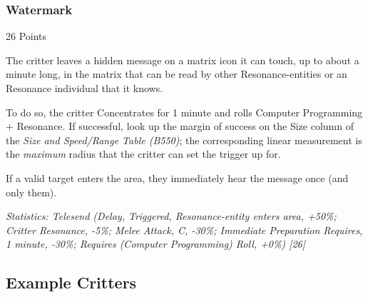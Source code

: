 \begin{multicols*}{3}
	\subsubsection{Watermark}\label{watermark}
	\begin{flushright}
		26 Points
	\end{flushright}

	The critter leaves a hidden message on a matrix icon it can touch, up to about a minute long, in the matrix that can be read by other Resonance-entities or an Resonance individual that it knows. 
	
	To do so, the critter Concentrates for 1 minute and rolls Computer Programming + Resonance. If successful, look up the margin of success on the Size column of the \textit{Size and Speed/Range Table (B550)}; the corresponding linear measurement is the \textit{maximum} radius that the critter can set the trigger up for.
	
	If a valid target enters the area, they immediately hear the message once (and only them).
	
	\textcolor{OliveGreen}{\textit{Statistics: Telesend (Delay, Triggered, Resonance-entity enters area, +50\%; Critter Resonance, -5\%; Melee Attack, C, -30\%; Immediate Preparation Requires, 1 minute, -30\%; Requires (Computer Programming) Roll, +0\%) [26] }}
	
	\subsection{Example Critters}
	
\end{multicols*}
